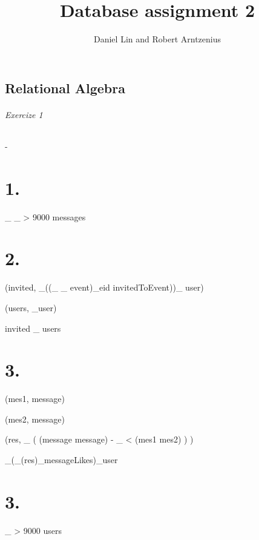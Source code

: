 \documentclass{article}
\title{Database assignment 2}
\author{Daniel Lin and Robert Arntzenius}
\begin{document}
\maketitle

\section{Relational Algebra}

\subparagraph*{Exercize 1}
-

\chapter{1.}


\pi_{}
\sigma_{ \wedge {} > 9000 }messages


\chapter{2.}


\rho(invited, \pi_{}((\pi_{} \sigma_{} event)\bowtie_{{eid}} 
invitedToEvent))\bowtie_{} user)

\rho(users, \pi_{}user)

invited \bowtie_{} users

\chapter{3.}

\rho(mes1, message)

\rho(mes2, message)

\rho(res, \pi_{} ( (message \times message) - \sigma_{ < }(mes1 \times mes2) ) )

\pi_{}(\pi_{}(res)\bowtie_{}messageLikes)\bowtie_{}user

\chapter{3.}




\sigma_{ \wedge {} > 9000 }users
\end{document}
